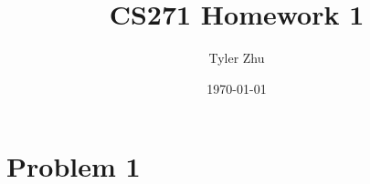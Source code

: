 \documentclass[11 pt]{scrartcl}
\newcommand{\hwtitle}{CS271 Homework 1}
\begin{document}
 
\title{\Large \hwtitle{}}
\author{\large Tyler Zhu}
\date{\large\today}

\maketitle 

\section{Problem 1}
\end{document}
